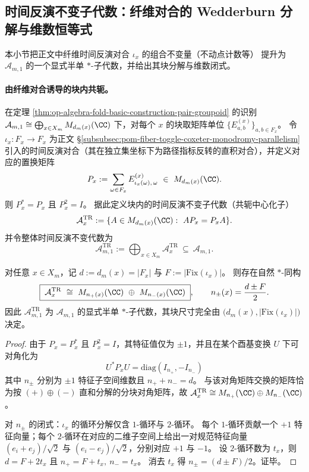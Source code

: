 \subsection{时间反演不变子代数：纤维对合的 Wedderburn 分解与维数恒等式}\label{subsec:op-algebra-fold-time-reversal-invariants}
本小节把正文中纤维时间反演对合 \(\iota_x\) 的组合不变量（不动点计数等）
提升为 \(\mathcal A_{m,1}\) 的一个显式半单 \(\ast\)-子代数，并给出其块分解与维数闭式。

\paragraph{由纤维对合诱导的块内共轭。}
在定理 \ref{thm:op-algebra-fold-basic-construction-pair-groupoid} 的识别
\(
\mathcal A_{m,1}\cong \bigoplus_{x\in X_m} M_{d_m(x)}(\CC)
\)
下，对每个 \(x\) 的块取矩阵单位 \(\{E^{(x)}_{a,b}\}_{a,b\in F_x}\)。
令 \(\iota_x:F_x\to F_x\) 为正文 \S\ref{subsubsec:pom-fiber-toggle-coxeter-monodromy-parallelism} 引入的时间反演对合（其在独立集坐标下为路径指标反转的直积对合），并定义对应的置换矩阵
\[
P_x:=\sum_{\omega\in F_x} E^{(x)}_{\iota_x(\omega),\,\omega}\ \in\ M_{d_m(x)}(\CC).
\]
则 \(P_x^\ast=P_x\) 且 \(P_x^2=I\)。
据此定义块内的时间反演不变子代数（共轭中心化子）
\[
\mathcal A_x^{\mathrm{TR}}
:=\{A\in M_{d_m(x)}(\CC):\ AP_x=P_xA\}.
\]
并令整体时间反演不变代数为
\[
\mathcal A_{m,1}^{\mathrm{TR}}:=\bigoplus_{x\in X_m}\mathcal A_x^{\mathrm{TR}}
\ \subseteq\ \mathcal A_{m,1}.
\]

\begin{theorem}\label{thm:op-algebra-time-reversal-invariant-wedderburn}
对任意 \(x\in X_m\)，记 \(d:=d_m(x)=|F_x|\) 与 \(F:=|\mathrm{Fix}(\iota_x)|\)。
则存在自然 \(\ast\)-同构
\[
\boxed{\;
\mathcal A_x^{\mathrm{TR}}\ \cong\ M_{n_+(x)}(\CC)\ \oplus\ M_{n_-(x)}(\CC)\;},
\qquad
n_\pm(x)=\frac{d\pm F}{2}.
\]
因此 \(\mathcal A_{m,1}^{\mathrm{TR}}\) 为 \(\mathcal A_{m,1}\) 的显式半单 \(\ast\)-子代数，其块尺寸完全由 \(\bigl(d_m(x),|\mathrm{Fix}(\iota_x)|\bigr)\) 决定。
\end{theorem}

\begin{proof}
由于 \(P_x=P_x^\ast\) 且 \(P_x^2=I\)，其特征值仅为 \(\pm 1\)，并且在某个酉基变换 \(U\) 下可对角化为
\[
U^\ast P_xU=\mathrm{diag}(I_{n_+},-I_{n_-})
\]
其中 \(n_\pm\) 分别为 \(\pm1\) 特征子空间维数且 \(n_++n_-=d\)。
与该对角矩阵交换的矩阵恰为按 \((+)\oplus(-)\) 直和分解的分块对角矩阵，故
\(
\mathcal A_x^{\mathrm{TR}}\cong M_{n_+}(\CC)\oplus M_{n_-}(\CC)
\)。
\par
对 \(n_\pm\) 的闭式：\(\iota_x\) 的循环分解仅含 \(1\)-循环与 \(2\)-循环。
每个 \(1\)-循环贡献一个 \(+1\) 特征向量；每个 \(2\)-循环在对应的二维子空间上给出一对规范特征向量
\((e_i+e_j)/\sqrt2\) 与 \((e_i-e_j)/\sqrt2\)，分别对应 \(+1\) 与 \(-1\)。
设 \(2\)-循环数为 \(t_x\)，则
\(
d=F+2t_x
\)
且
\(
n_+=F+t_x,\ n_-=t_x
\)。
消去 \(t_x\) 得 \(n_\pm=(d\pm F)/2\)。证毕。
\end{proof}

